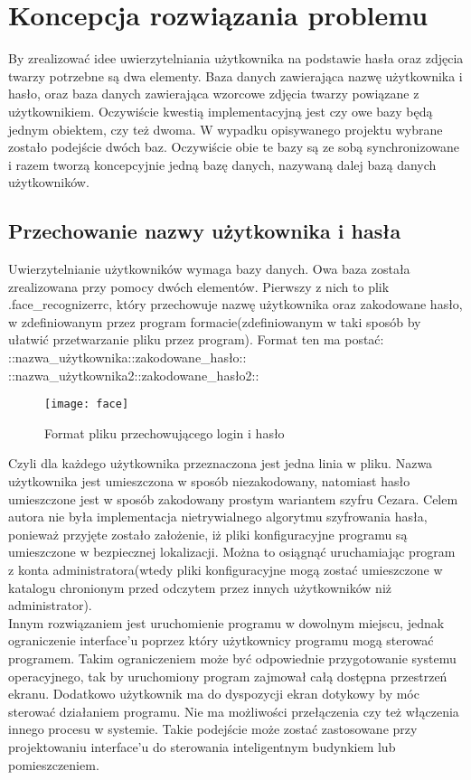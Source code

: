 \documentclass[eng,printmode]{mgr}
\begin{document}
\section{Koncepcja rozwiązania problemu}

By zrealizować idee uwierzytelniania użytkownika na podstawie hasła oraz zdjęcia twarzy potrzebne są dwa elementy. Baza danych zawierająca nazwę użytkownika i hasło, oraz baza danych zawierająca wzorcowe zdjęcia twarzy powiązane z użytkownikiem. Oczywiście kwestią implementacyjną jest czy owe bazy będą jednym obiektem, czy też dwoma. W wypadku opisywanego projektu wybrane zostało podejście dwóch baz. Oczywiście obie te bazy są ze sobą synchronizowane i razem tworzą koncepcyjnie jedną bazę danych, nazywaną dalej bazą danych użytkowników.
\subsection{Przechowanie nazwy użytkownika i hasła}

Uwierzytelnianie użytkowników wymaga bazy danych. Owa baza została zrealizowana przy pomocy dwóch elementów. Pierwszy z nich to plik .face\_recognizerrc, który przechowuje nazwę użytkownika oraz zakodowane hasło, w zdefiniowanym przez program formacie(zdefiniowanym w taki sposób by ułatwić przetwarzanie pliku przez program). Format ten ma postać:\\
::nazwa\_użytkownika::zakodowane\_hasło::\\
::nazwa\_użytkownika2::zakodowane\_hasło2:: \\
\begin{figure}[placement h]
\texttt{[image: face]}
\caption{Format pliku przechowującego login i hasło}
\end{figure}

Czyli dla każdego użytkownika przeznaczona jest jedna linia w pliku. Nazwa użytkownika jest umieszczona w sposób niezakodowany, natomiast hasło umieszczone jest w sposób zakodowany prostym wariantem szyfru Cezara. Celem autora nie była implementacja nietrywialnego algorytmu szyfrowania hasła, ponieważ przyjęte zostało założenie, iż pliki konfiguracyjne programu są umieszczone w bezpiecznej lokalizacji. Można to osiągnąć uruchamiając program z konta administratora(wtedy pliki konfiguracyjne mogą zostać umieszczone w katalogu chronionym przed odczytem przez innych użytkowników niż administrator).
\\

Innym rozwiązaniem jest uruchomienie programu w dowolnym miejscu, jednak ograniczenie interface'u poprzez który użytkownicy programu mogą sterować programem. Takim ograniczeniem może być odpowiednie przygotowanie systemu operacyjnego, tak by uruchomiony program zajmował całą dostępna przestrzeń ekranu. Dodatkowo użytkownik ma do dyspozycji ekran dotykowy by móc sterować działaniem programu. Nie ma możliwości przełączenia czy też włączenia innego procesu w systemie. Takie podejście może zostać zastosowane przy projektowaniu interface'u do sterowania inteligentnym budynkiem lub pomieszczeniem.
\end{document}
